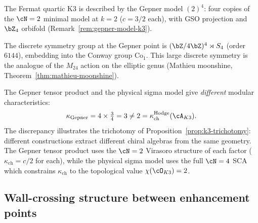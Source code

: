 \begin{remark}
\label{rem:k3-fermat-quartic}
The Fermat quartic K3 is described by the Gepner model $(2)^4$:
four copies of the $\cN = 2$ minimal model at $k = 2$
($c = 3/2$ each), with GSO projection and $\bZ_4$ orbifold
(Remark~\ref{rem:gepner-model-k3}).

The discrete symmetry group at the Gepner point is
$(\bZ/4\bZ)^4 \rtimes S_4$ (order $6144$), embedding into the
Conway group $\mathrm{Co}_1$. This large discrete symmetry
is the analogue of the $M_{24}$ action on the elliptic genus
(Mathieu moonshine, Theorem~\ref{thm:mathieu-moonshine}).

The Gepner tensor product and the physical sigma model give
\emph{different} modular characteristics:
\[
 \kappa_{\mathrm{Gepner}} = 4 \times \tfrac{3}{4} = 3
 \neq 2 = \kappa_{\mathrm{ch}}^{\mathrm{Hodge}}(\cA_{K3}).
\]
The discrepancy illustrates the trichotomy of
Proposition~\ref{prop:k3-trichotomy}: different constructions
extract different chiral algebras from the same geometry.
The Gepner tensor product uses the $\cN = 2$ Virasoro structure
of each factor ($\kappa_{\mathrm{ch}} = c/2$ for each), while the
physical sigma model uses the full $\cN = 4$ SCA which constrains
$\kappa_{\mathrm{ch}}$ to the topological value $\chi(\cO_{K3}) = 2$.
\end{remark}

\subsection{Wall-crossing structure between enhancement points}
\label{subsec:k3-enhancement-wall-crossing}

